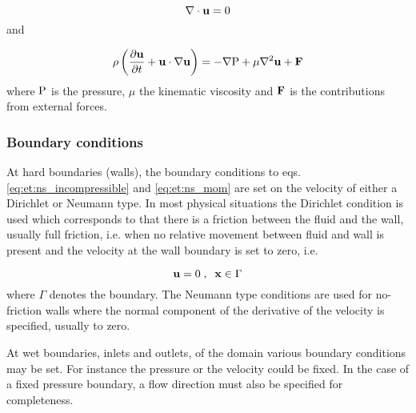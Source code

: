 \begin{equation}\label{eq:et:ns_incompressible}
 \nabla \cdot \mathbf{u} = 0
\end{equation}
and

\begin{equation}\label{eq:et:ns_mom}
\mathrm{\rho} \left (\dfrac{\partial \mathbf{u}}{\partial t} +
  \mathbf{u} \cdot \nabla \mathbf{u} 
  \right ) = - \nabla \mathrm{P}  + \mu \nabla^2 \mathbf{u} + \mathbf{F}
\end{equation}
where $\mathrm{P}$ is the pressure, $\mu$ the kinematic viscosity and $\mathbf{F}$
is the contributions from  external forces.

\subsubsection{Boundary conditions}

At hard boundaries (walls), the boundary conditions to
eqs. \eqref{eq:et:ns_incompressible} and \eqref{eq:et:ns_mom} are set
on the velocity of either a Dirichlet or Neumann type. In most
physical situations the Dirichlet condition is used which corresponds
to that there is a friction between the fluid and the wall, usually
full friction, i.e. when no relative movement between fluid and wall
is present and the velocity at the wall boundary is set to zero, i.e.

\begin{equation}
\mathbf{u} = 0 \;,\;\; \mathbf{x} \in \Gamma
\end{equation} 
where $\Gamma$ denotes the boundary. The Neumann type conditions are
used for no-friction walls where the normal component of the
derivative of the velocity is specified, usually to zero.

At wet boundaries, inlets and outlets, of the domain various boundary
conditions may be set. For instance the pressure or the velocity could
be fixed. In the case of a fixed pressure boundary, a flow direction
must also be specified for completeness. \cite{he_zou}
